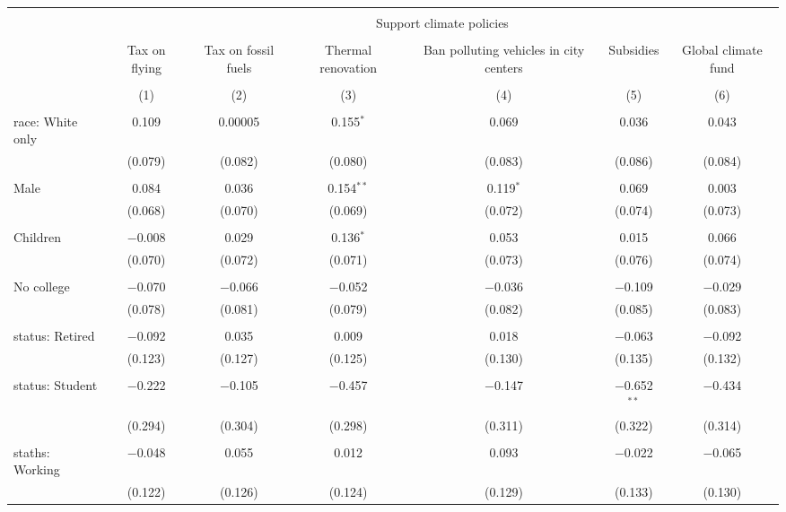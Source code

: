 
\begin{tabular}{@{\extracolsep{5pt}}lcccccc} 
\\[-1.8ex]\hline 
\hline \\[-1.8ex] 
 & \multicolumn{6}{c}{Support climate policies} \\ 
\cline{2-7} 
\\[-1.8ex] & Tax on flying & Tax on fossil fuels & Thermal renovation & Ban polluting vehicles in city centers & Subsidies & Global climate fund \\ 
\\[-1.8ex] & (1) & (2) & (3) & (4) & (5) & (6)\\ 
\hline \\[-1.8ex] 
 race: White only & 0.109 & 0.00005 & 0.155$^{*}$ & 0.069 & 0.036 & 0.043 \\ 
  & (0.079) & (0.082) & (0.080) & (0.083) & (0.086) & (0.084) \\ 
  & & & & & & \\ 
 Male & 0.084 & 0.036 & 0.154$^{**}$ & 0.119$^{*}$ & 0.069 & 0.003 \\ 
  & (0.068) & (0.070) & (0.069) & (0.072) & (0.074) & (0.073) \\ 
  & & & & & & \\ 
 Children & $-$0.008 & 0.029 & 0.136$^{*}$ & 0.053 & 0.015 & 0.066 \\ 
  & (0.070) & (0.072) & (0.071) & (0.073) & (0.076) & (0.074) \\ 
  & & & & & & \\ 
 No college & $-$0.070 & $-$0.066 & $-$0.052 & $-$0.036 & $-$0.109 & $-$0.029 \\ 
  & (0.078) & (0.081) & (0.079) & (0.082) & (0.085) & (0.083) \\ 
  & & & & & & \\ 
 status: Retired & $-$0.092 & 0.035 & 0.009 & 0.018 & $-$0.063 & $-$0.092 \\ 
  & (0.123) & (0.127) & (0.125) & (0.130) & (0.135) & (0.132) \\ 
  & & & & & & \\ 
 status: Student & $-$0.222 & $-$0.105 & $-$0.457 & $-$0.147 & $-$0.652$^{**}$ & $-$0.434 \\ 
  & (0.294) & (0.304) & (0.298) & (0.311) & (0.322) & (0.314) \\ 
  & & & & & & \\ 
 staths: Working & $-$0.048 & 0.055 & 0.012 & 0.093 & $-$0.022 & $-$0.065 \\ 
  & (0.122) & (0.126) & (0.124) & (0.129) & (0.133) & (0.130) \\ 

\end{tabular}
